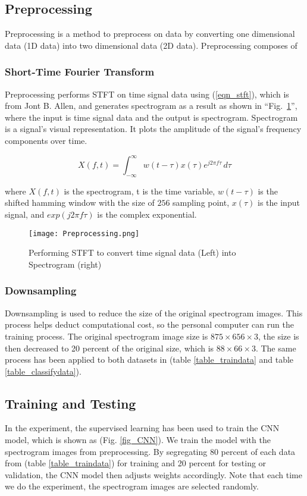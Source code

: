 \documentclass[conference]{IEEEtran}
\begin{document}
\subsection{Preprocessing}
Preprocessing is a method to preprocess on data by converting one dimensional data (1D data) into two dimensional data (2D data). Preprocessing composes of 


\subsubsection{Short-Time Fourier Transform}
Preprocessing performs STFT on time signal data using (\ref{eqn_stft}), which is from Jont B. Allen\cite{b3}, and generates spectrogram as a result as shown in ``Fig.~\ref{fig_preprocessing}'', where the input is time signal data and the output is spectrogram. Spectrogram is a signal's visual representation. It plots the amplitude of the signal's frequency components over time. 

\begin{equation}
X(f,t) = \int_{-\infty}^{\infty} w(t-\tau)x(\tau)e^{j2\pi f\tau} \,d\tau \label{eqn_stft}
\end{equation}

where \(X(f, t) \) is the spectrogram, t is the time variable, \(w(t - \tau)\) is the shifted hamming window with the size of \(256\) sampling point, \(x(\tau)\) is the input
signal, and \(exp (j2\pi f\tau)\) is the complex exponential.

\begin{figure}[htbp]
\centerline{\texttt{[image: Preprocessing.png]}}
\caption{Performing STFT to convert time signal data (Left) into Spectrogram (right)}
\label{fig_preprocessing}
\end{figure}


\subsubsection{Downsampling}
Downsampling is used to reduce the size of the original spectrogram images. This process helps deduct computational cost, so the personal computer can run the training process. The original spectrogram image size is $ 875 \times 656 \times 3$, the size is then decreased to 20 percent of the original size, which is $88 \times 66 \times 3$. The same process has been applied to both datasets in (table \ref{table_traindata} and table \ref{table_classifydata}).


\subsection{Training and Testing}
In the experiment, the supervised learning has been used to train the CNN model, which is shown as (Fig. \ref{fig_CNN}). We train the model with the spectrogram images from preprocessing. By segregating 80 percent of each data from (table \ref{table_traindata}) for training and 20 percent for testing or validation, the CNN model then adjusts weights accordingly. Note that each time we do the experiment, the spectrogram images are selected randomly.
\end{document}
